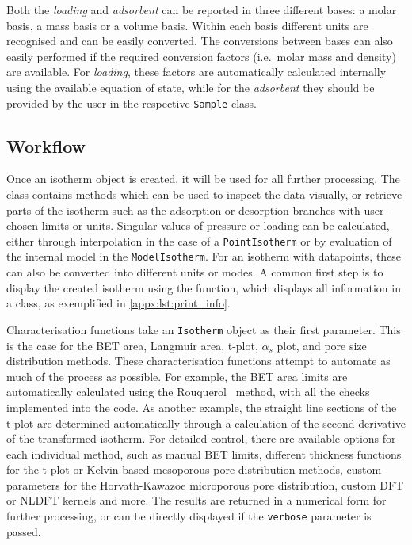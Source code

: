 Both the \textit{loading} and \textit{adsorbent} can be reported
in three different bases: a molar basis, a mass basis or a volume
basis. Within each basis different units are recognised and can be
easily converted. The conversions between bases can also
easily performed if the required conversion factors (i.e.\ molar 
mass and density) are available. For \textit{loading}, these 
factors are automatically calculated internally using the 
available equation of state, while for the \textit{adsorbent} 
they should be provided by the user in the respective \texttt{Sample}
 class.

\subsection{Workflow}

Once an isotherm object is created, it will be used for all 
further processing. The class contains methods which can be 
used to inspect the data visually, or retrieve
parts of the isotherm such as the adsorption or desorption branches with
user-chosen limits or units. Singular values of pressure or 
loading can be calculated, either through interpolation in the
case of a \texttt{PointIsotherm} or by evaluation
of the internal model in the \texttt{ModelIsotherm}. For an isotherm with
datapoints, these can also be converted into different units or modes.
A common first step is to display the created isotherm using the 
 function, which displays all information in a
class, as exemplified in \autoref{appx:lst:print_info}.

Characterisation functions take an \texttt{Isotherm} object as their
first parameter. This is the case for the \gls{BET} area, Langmuir area, 
t-plot, \(\alpha_s\) plot, and pore size distribution methods.
These characterisation functions attempt to automate as much
of the process as possible. For example, the \gls{BET} area limits are
automatically calculated using the 
Rouquerol~\cite{rouquerolAdsorptionPowdersPorous2013} method, 
with all the checks implemented into the code. As another example,
the straight line sections of the t-plot are determined automatically
through a calculation of the second derivative of the transformed isotherm.
For detailed control, there are available options for each individual 
method, such as manual \gls{BET} limits, different thickness functions for
the t-plot or Kelvin-based mesoporous pore distribution methods, 
custom parameters for the Horvath-Kawazoe microporous pore
distribution, custom \gls{DFT} or \gls{NLDFT} kernels and more. The results are
returned in a numerical form for further processing, or can be directly
displayed if the \texttt{verbose} parameter is passed.

